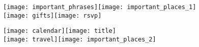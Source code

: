 \documentclass[6pt]{article}
\begin{document}
\pagestyle{empty}

\noindent\texttt{[image: important\_phrases]}\texttt{[image: important\_places\_1]}\\
\texttt{[image: gifts]}\texttt{[image: rsvp]}

\newpage

\noindent\texttt{[image: calendar]}\texttt{[image: title]}\\
\texttt{[image: travel]}\texttt{[image: important\_places\_2]}
\end{document}
